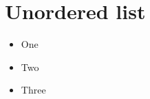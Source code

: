 \documentclass{article}
\begin{document}
\section{Unordered list}
\begin{itemize}
	\item One
	\item Two
	\item Three
\end{itemize}
\end{document}
